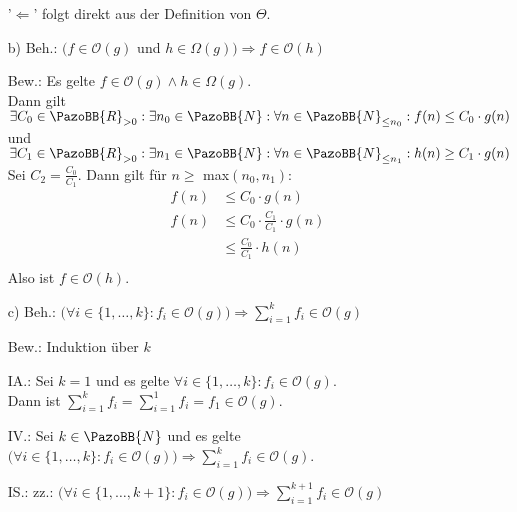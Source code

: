 \documentclass[12pt]{article}
\newcommand {\N}{\PazoBB{N}}   %
\newcommand {\R}{\PazoBB{R}}   %
\newcommand {\Om}{\mathcal{O}} %
\begin{document}
\begin{enumerate}
                       '$\Longleftarrow$' folgt direkt aus der Definition von $\Theta$.


\item[b) Beh.:] 
          $\big(f\in \Om(g) $ und $ h \in \Omega(g) \big) \Longrightarrow f \in \Om(h)$
\item[Bew.:] Es gelte $f\in \Om(g) \land h \in \Omega(g)$.  \\
                     Dann gilt 
                     $\exists C_0\in  \R_{>0} : \exists n_0 \in \N : \forall n \in \N_{\leq n_0} : f(n) \leq C_0 \cdot g(n)$ \\
                     und $\exists C_1\in \R_{>0} : \exists n_1 \in \N : \forall n \in \N_{\leq n_1} : h(n) \geq C_1 \cdot g(n)$ \\
                     Sei $C_2 = \frac{C_0}{C_1}$. Dann gilt für $n\geq$ max$(n_0, n_1)$:
                      \begin{align*}
                                                        f(n)                       &  \leq C_0 \cdot g(n)                                    \\
                                                        f(n)                       &  \leq C_0 \cdot \frac {C_1} {C_1} \cdot g(n)          \\
                                                                                     &  \leq \frac{C_0}{C_1} \cdot h(n)                           \\
                      \end{align*}
                      Also ist $f \in\Om(h)$.



\item[c) Beh.:] 
          $\big( \forall i\in\{1, \dots, k\} : f_i \in \Om(g) \big) \Longrightarrow \sum^k_{i=1} f_i \in\Om(g)$
\item[Bew.:] Induktion über $k$
\item[IA.:] Sei $k=1$ und es gelte $\forall i\in\{1, \dots, k\} : f_i \in \Om(g)$.\\
                  Dann ist  $\sum^k_{i=1} f_i = \sum^1_{i=1} f_i = f_1 \in \Om(g)$.
\item[IV.:] Sei $k\in \N$  und es gelte $\big( \forall i\in\{1, \dots, k\} : f_i \in \Om(g) \big) \Longrightarrow \sum^k_{i=1} f_i \in\Om(g)$.

\item[IS.:] zz.: $\big( \forall i\in\{1, \dots, k+1\} : f_i \in \Om(g) \big) \Longrightarrow \sum^{k+1}_{i=1} f_i \in\Om(g)$\\


\end{enumerate}
\end{document}
